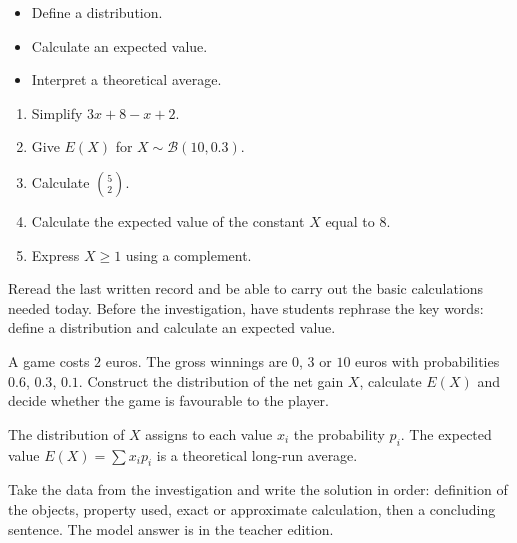 \begin{objectifs}\begin{itemize}\item Define a distribution.\item Calculate an expected value.\item Interpret a theoretical average.\end{itemize}\end{objectifs}
\begin{automatismes}\begin{enumerate}\item Simplify $3x+8-x+2$. \item Give $E(X)$ for $X\sim\mathcal B(10,0.3)$. \item Calculate $\binom52$. \item Calculate the expected value of the constant $X$ equal to $8$. \item Express $X\geq1$ using a complement. \end{enumerate}\end{automatismes}
\begin{prerequis}Reread the last written record and be able to carry out the basic calculations needed today. Before the investigation, have students rephrase the key words: define a distribution and calculate an expected value.\end{prerequis}

\begin{activite}
A game costs $2$ euros. The gross winnings are $0$, $3$ or $10$ euros with probabilities $0.6$, $0.3$, $0.1$. Construct the distribution of the net gain $X$, calculate $E(X)$ and decide whether the game is favourable to the player.

\end{activite}

\begin{traceecrite}The distribution of $X$ assigns to each value $x_i$ the probability $p_i$. The expected value $E(X)=\sum x_ip_i$ is a theoretical long-run average.\end{traceecrite}

\begin{exemple}
Take the data from the investigation and write the solution in order: definition of the objects, property used, exact or approximate calculation, then a concluding sentence. The model answer is in the teacher edition.
\end{exemple}

